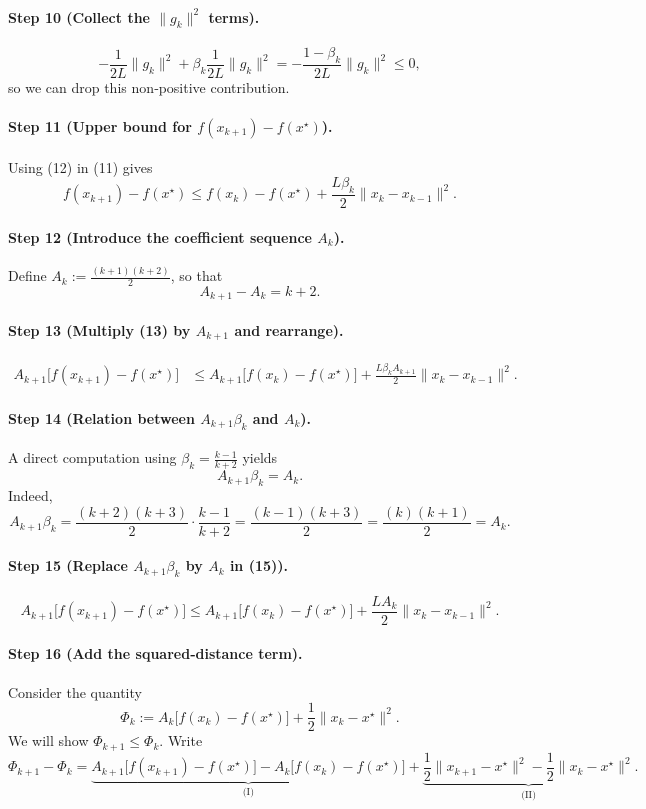 \documentclass{article}
\begin{document}
\paragraph{Step 10 (Collect the $\|g_k\|^{2}$ terms).}
\[
-\frac{1}{2L}\|g_k\|^{2}+ \beta_k\frac{1}{2L}\|g_k\|^{2}
= -\frac{1-\beta_k}{2L}\|g_k\|^{2}\le 0,
\tag{12}
\]
so we can drop this non‑positive contribution.

\paragraph{Step 11 (Upper bound for $f(x_{k+1})-f(x^\star)$).}
Using (12) in (11) gives
\[
f(x_{k+1})-f(x^\star)\le f(x_k)-f(x^\star)
   +\frac{L\beta_k}{2}\|x_k-x_{k-1}\|^{2}.
\tag{13}
\]

\paragraph{Step 12 (Introduce the coefficient sequence $A_k$).}
Define $A_k:=\frac{(k+1)(k+2)}{2}$, so that
\[
A_{k+1}-A_k = k+2 .
\tag{14}
\]

\paragraph{Step 13 (Multiply (13) by $A_{k+1}$ and rearrange).}
\[
\begin{aligned}
A_{k+1}\!\bigl[f(x_{k+1})-f(x^\star)\bigr]
&\le A_{k+1}\!\bigl[f(x_k)-f(x^\star)\bigr]
   +\frac{L\beta_k A_{k+1}}{2}\|x_k-x_{k-1}\|^{2}.
\end{aligned}
\tag{15}
\]

\paragraph{Step 14 (Relation between $A_{k+1}\beta_k$ and $A_k$).}
A direct computation using $\beta_k=\frac{k-1}{k+2}$ yields
\[
A_{k+1}\beta_k = A_k .
\tag{16}
\]
Indeed,
\[
A_{k+1}\beta_k
= \frac{(k+2)(k+3)}{2}\cdot\frac{k-1}{k+2}
= \frac{(k-1)(k+3)}{2}
= \frac{(k)(k+1)}{2}=A_k .
\]

\paragraph{Step 15 (Replace $A_{k+1}\beta_k$ by $A_k$ in (15)).}
\[
A_{k+1}\!\bigl[f(x_{k+1})-f(x^\star)\bigr]
\le A_{k+1}\!\bigl[f(x_k)-f(x^\star)\bigr]
   +\frac{L A_k}{2}\|x_k-x_{k-1}\|^{2}.
\tag{17}
\]

\paragraph{Step 16 (Add the squared‑distance term).}
Consider the quantity
\[
\Phi_k:=A_k\bigl[f(x_k)-f(x^\star)\bigr]+\frac12\|x_k-x^\star\|^{2}.
\tag{18}
\]
We will show $\Phi_{k+1}\le\Phi_k$.  Write
\[
\Phi_{k+1}-\Phi_k
= \underbrace{A_{k+1}\!\bigl[f(x_{k+1})-f(x^\star)\bigr]
        -A_k\!\bigl[f(x_k)-f(x^\star)\bigr]}_{\text{(I)}}
  +\underbrace{\frac12\|x_{k+1}-x^\star\|^{2}
        -\frac12\|x_k-x^\star\|^{2}}_{\text{(II)}} .
\tag{19}
\]
\end{document}
